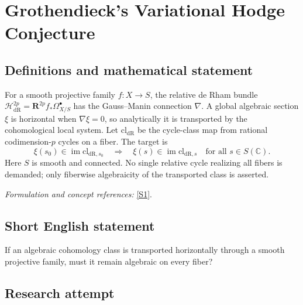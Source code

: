 \documentclass[11pt,a4paper]{article}
\newcommand{\C}{\mathbb{C}}
\newcommand{\sref}[2]{\hyperlink{source:#1:#2}{[S#2]}}
\newif\ifshowcatalogue
\newcommand{\cataloguescope}[1]{\ifshowcatalogue
 \paragraph{Exact scope in the supplied catalogue.}
 \begin{quote}\small #1\end{quote}\fi}
\numberwithin{equation}{section}
\begin{document}
\setcounter{section}{0}
\clearpage
\section*{\texorpdfstring{Grothendieck's Variational Hodge Conjecture}{Grothendieck's Variational Hodge Conjecture}}\label{statement}
\subsection{Definitions and mathematical statement}
For a smooth projective family $f:X\to S$, the relative de Rham bundle
$\mathcal H^{2p}_{\mathrm{dR}}=\mathbf R^{2p}f_*\Omega^\bullet_{X/S}$ has the Gauss--Manin connection $\nabla$. A global algebraic section $\xi$ is horizontal when $\nabla\xi=0$, so analytically it is transported by the cohomological local system. Let $\mathrm{cl}_{\mathrm{dR}}$ be the cycle-class map from rational codimension-$p$ cycles on a fiber. The target is
\[
 \xi(s_0)\in\operatorname{im}\mathrm{cl}_{\mathrm{dR},s_0}
 \quad\Longrightarrow\quad
 \xi(s)\in\operatorname{im}\mathrm{cl}_{\mathrm{dR},s}\quad\text{for all }s\in S(\C).
\]
Here $S$ is smooth and connected. No single relative cycle realizing all fibers is demanded; only fiberwise algebraicity of the transported class is asserted.
\par\smallskip\textit{Formulation and concept references:} \sref{statement}{1}.
\cataloguescope{For every smooth projective morphism f:X->S of smooth connected complex algebraic varieties, every integer p>=0, and every global algebraic horizontal section xi of the relative algebraic de Rham cohomology bundle R\textasciicircum{}(2p)f\_*Omega\textasciicircum{}.\_(X/S) for the Gauss-Manin connection, if xi(s0) is the de Rham cycle class of a rational algebraic codimension-p cycle on one fiber X\_s0, then xi(s) is such a rational algebraic cycle class on every fiber X\_s for s in S(C).}
\subsection{Short English statement}
If an algebraic cohomology class is transported horizontally through a smooth projective family, must it remain algebraic on every fiber?
\subsection{Research attempt}
\end{document}
